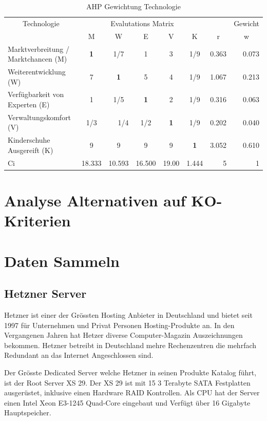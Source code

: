 \begin{table}[htbp]
\caption{AHP Gewichtung Technologie}
\begin{tabular}{|p{3.9cm}|c|c|c|c|c|r|r|}
\hline
\multicolumn{ 1}{|c|}{Technologie} & \multicolumn{ 5}{c|}{Evalutations Matrix} & \multicolumn{1}{l|}{} & \multicolumn{1}{l|}{Gewicht} \\ \cline{ 2- 8}
\multicolumn{ 1}{|c|}{} & M & W & E & V & K & \multicolumn{1}{c|}{r} & \multicolumn{1}{c|}{w} \\ \hline
Marktverbreitung / Marktchancen (M) & \textbf{1} &  1/7 & 1 & 3 &  1/9 & 0.363 & 0.073 \\ \hline
Weiterentwicklung (W) & 7 & \textbf{1} & 5 & 4 &  1/9 & 1.067 & 0.213 \\ \hline
Verfügbarkeit von Experten (E) & 1 &  1/5 & \textbf{1} & 2 &  1/9 & 0.316 & 0.063 \\ \hline
Verwaltungskomfort (V) &  1/3 & \multicolumn{1}{r|}{ 1/4} &  1/2 & \textbf{1} &  1/9 & 0.202 & 0.040 \\ \hline
Kinderschuhe Ausgereift (K) & 9 & 9 & 9 & 9 & \textbf{1} & 3.052 & 0.610 \\ \hline  \hline
Ci & \multicolumn{1}{r|}{18.333} & \multicolumn{1}{r|}{10.593} & \multicolumn{1}{r|}{16.500} & \multicolumn{1}{r|}{19.00} & \multicolumn{1}{r|}{1.444} & 5 & 1 \\ \hline
\end{tabular}
\label{AHPTechnologie}
\end{table}


\section{Analyse Alternativen auf KO-Kriterien}

\section{Daten Sammeln}
\subsection{Hetzner Server}
Hetzner ist einer der Grössten Hosting Anbieter in Deutschland und bietet seit 1997 für Unternehmen und Privat Personen Hosting-Produkte an. In den Vergangenen Jahren hat Hetzer diverse Computer-Magazin Auszeichnungen bekommen. Hetzner betreibt in Deutschland mehre Rechenzentren die mehrfach Redundant an das Internet Angeschlossen sind.

Der Grösste Dedicated Server welche Hetzner in seinen Produkte Katalog führt, ist der Root Server XS 29. Der XS 29 ist mit 15 3 Terabyte SATA Festplatten ausgerüstet, inklusive einen Hardware RAID Kontrollen. Als CPU hat der Server einen Intel Xeon E3-1245 Quad-Core eingebaut und Verfügt über 16 Gigabyte Hauptspeicher. 

